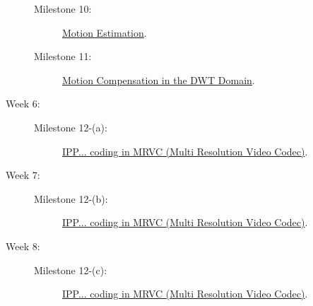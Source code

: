 \begin{description}
  \begin{description}
  \item [Milestone 10:] \href{https://sistemas-multimedia.github.io/milestones/10-ME/}{Motion Estimation}. %
  \item [Milestone 11:] \href{https://sistemas-multimedia.github.io/milestones/11-MC_in_DWT_domain/}{Motion Compensation in the DWT Domain}.
  \end{description}
\item [Week 6:]
  \begin{description}
  \item [Milestone 12-(a):] \href{https://sistemas-multimedia.github.io/milestones/12-IPP_coding/}{IPP... coding in MRVC (Multi Resolution Video Codec)}.
  \end{description}
\item [Week 7:]
  \begin{description}
  \item [Milestone 12-(b):] \href{https://sistemas-multimedia.github.io/milestones/12-IPP_coding/}{IPP... coding in MRVC (Multi Resolution Video Codec)}.
  \end{description}
\item [Week 8:]
  \begin{description}
  \item [Milestone 12-(c):] \href{https://sistemas-multimedia.github.io/milestones/12-IPP_coding/}{IPP... coding in MRVC (Multi Resolution Video Codec)}.
  \end{description}
\end{description}
